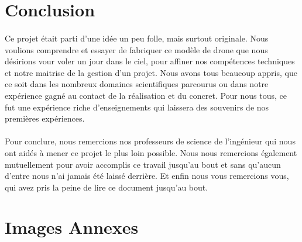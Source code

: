 \documentclass[a4paper,11pt]{article}
\begin{document}
\section{Conclusion}

\paragraph{}Ce projet était parti d'une idée un peu folle, mais surtout originale. Nous voulions comprendre et essayer de fabriquer ce modèle de drone que nous désirions vour voler un jour dans le ciel, pour affiner nos compétences techniques et notre maitrise de la gestion d'un projet. Nous avons tous beaucoup appris, que ce soit dans les nombreux domaines scientifiques parcourus ou dans notre expérience gagné au contact de la réalisation et du concret. Pour nous tous, ce fut une expérience riche d'enseignements qui laissera des souvenirs de nos premières expériences.

\paragraph{}Pour conclure, nous remercions nos professeurs de science de l'ingénieur qui nous ont aidés à mener ce projet le plus loin possible. Nous nous remercions également mutuellement pour avoir accomplis ce travail jusqu'au bout et sans qu'aucun d'entre nous n'ai jamais été laissé derrière. Et enfin nous vous remercions vous, qui avez pris la peine de lire ce document jusqu'au bout.

\section{Images Annexes}
\end{document}
